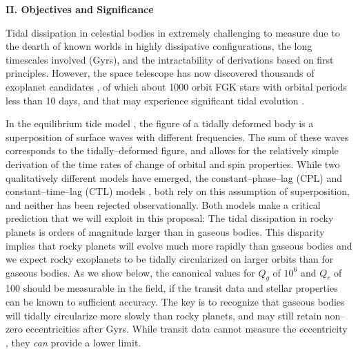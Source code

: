 \bigskip
\centerline{\bf II. Objectives and Significance}
\smallskip

\medskip
{\centerline{}}
\smallskip

Tidal dissipation in celestial bodies in extremely challenging to
measure
\citep{GoldreichSoter66,Hut81,AksnesFranklin01,Jackson08,Jackson09,Lainey12}
due to the dearth of known worlds in highly dissipative
configurations, the long timescales involved (Gyrs), and the
intractability of derivations based on first principles.  However,
the \kepler space telescope has now discovered thousands of exoplanet
candidates
\citep{2013ApJS..204...24B}, of which about 1000 orbit FGK stars with
orbital periods less than 10 days, and that may experience significant
tidal evolution \citep{Rasio96,Jackson08,Matsumura10}.

In the equilibrium tide model
\citep{Darwin1880,MacDonald64,GoldreichSoter66,Hut81,FerrazMello08,Leconte10},
the figure of a tidally deformed body is a superposition of surface
waves with different frequencies.  The sum of these waves corresponds
to the tidally--deformed figure, and allows for the relatively simple
derivation of the time rates of change of orbital and spin properties.
While two qualitatively different models have emerged, the
constant--phase--lag (CPL) and constant--time--lag (CTL) models
\citep{Greenberg09}, both rely on this assumption of superposition,
and neither has been rejected observationally.  Both models make a
critical prediction that we will exploit in this proposal: The tidal
dissipation in rocky planets is orders of magnitude larger than in
gaseous bodies.  This disparity implies that rocky planets will evolve
much more rapidly than gaseous bodies and we expect rocky exoplanets
to be tidally circularized on larger orbits than for gaseous bodies.
As we show below, the canonical values for $Q_g$ of $10^6$ and $Q_r$
of 100 should be measurable in the \kepler field, if the transit data
and stellar properties can be known to sufficient accuracy.  The key
is to recognize that gaseous bodies will tidally circularize more
slowly than rocky planets, and may still retain non--zero
eccentricities after Gyrs.  While transit data cannot measure the
eccentricity \citep{Barnes07}, they {\it can} provide a lower limit.

\medskip
{\centerline{}}
\smallskip

